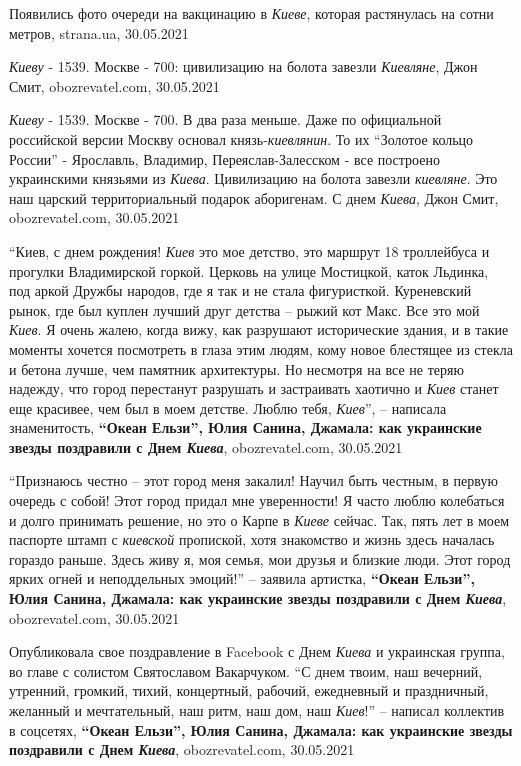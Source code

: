 Появились фото очереди на вакцинацию в \emph{Киеве}, которая растянулась на сотни
метров, strana.ua, 30.05.2021

\emph{Киеву} - 1539. Москве - 700: цивилизацию на болота завезли
\emph{Киевляне}, Джон Смит, obozrevatel.com, 30.05.2021

\emph{Киеву} - 1539. Москве - 700. В два раза меньше.  Даже по официальной
российской версии Москву основал князь-\emph{киевлянин}.  То их
\enquote{Золотое кольцо России} - Ярославль, Владимир, Переяслав-Залесском -
все построено украинскими князьями из \emph{Киева}.  Цивилизацию на болота
завезли \emph{киевляне}.  Это наш царский территориальный подарок аборигенам.
С днем \emph{Киева}, Джон Смит, obozrevatel.com, 30.05.2021

\enquote{Киев, с днем рождения! \emph{Киев} это мое детство, это маршрут 18 троллейбуса
и прогулки Владимирской горкой. Церковь на улице Мостицкой, каток Льдинка, под
аркой Дружбы народов, где я так и не стала фигуристкой. Куреневский рынок, где
был куплен лучший друг детства – рыжий кот Макс. Все это мой \emph{Киев}. Я
очень жалею, когда вижу, как разрушают исторические здания, и в такие моменты
хочется посмотреть в глаза этим людям, кому новое блестящее из стекла и бетона
лучше, чем памятник архитектуры. Но несмотря на все не теряю надежду, что город
перестанут разрушать и застраивать хаотично и \emph{Киев} станет еще красивее,
чем был в моем детстве. Люблю тебя, \emph{Киев}}, – написала знаменитость,
\textbf{\enquote{Океан Ельзи}, Юлия Санина, Джамала: как украинские звезды
поздравили с Днем \emph{Киева}}, obozrevatel.com, 30.05.2021

\enquote{Признаюсь честно – этот город меня закалил! Научил быть честным, в первую
очередь с собой! Этот город придал мне уверенности! Я часто люблю колебаться и
долго принимать решение, но это о Карпе в \emph{Киеве} сейчас. Так, пять лет в моем
паспорте штамп с \emph{киевской} пропиской, хотя знакомство и жизнь здесь началась
гораздо раньше. Здесь живу я, моя семья, мои друзья и близкие люди. Этот город
ярких огней и неподдельных эмоций!} – заявила артистка,
\textbf{\enquote{Океан Ельзи}, Юлия Санина, Джамала: как украинские звезды
поздравили с Днем \emph{Киева}}, obozrevatel.com, 30.05.2021

Опубликовала свое поздравление в Facebook с Днем \emph{Киева} и украинская
группа, во главе с солистом Святославом Вакарчуком.  \enquote{С днем твоим, наш
вечерний, утренний, громкий, тихий, концертный, рабочий, ежедневный и
праздничный, желанный и мечтательный, наш ритм, наш дом, наш \emph{Киев}!} –
написал коллектив в соцсетях, \textbf{\enquote{Океан Ельзи}, Юлия Санина,
Джамала: как украинские звезды поздравили с Днем \emph{Киева}},
obozrevatel.com, 30.05.2021

